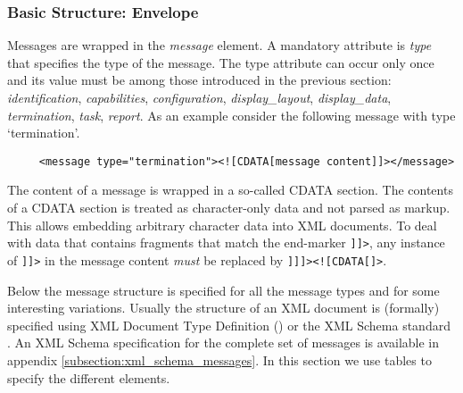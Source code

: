 \documentclass{article}
\begin{document}
   \subsubsection{Basic Structure: Envelope} \label{ss:structure}

    \noindent Messages are wrapped in the \textit{message} element. A mandatory
    attribute is \textit{type} that specifies the type of the message. The type
    attribute can occur only once and its value must be among those introduced
    in the previous section: \textit{identification}, \textit{capabilities},
    \textit{configuration}, \textit{display\_layout}, \textit{display\_data},
    \textit{termination}, \textit{task},
    \textit{report}. As an example consider the following message with type
    `termination'.
 
    \begin{verbatim}
     <message type="termination"><![CDATA[message content]]></message>\end{verbatim}

    \noindent The content of a message is wrapped in a so-called CDATA section. The
    contents of a CDATA section is treated as character-only data and not
    parsed as markup. This allows embedding arbitrary character data into XML
    documents. To deal with data that contains fragments that match the
    end-marker \verb']]>', any instance of \verb']]>' in the message content
    \textit{must} be replaced by \verb']]]><![CDATA[]>'.
    
    \noindent Below the message structure is specified for all the
    message types and for some interesting variations. Usually the structure
    of an XML document is (formally) specified using XML Document Type
    Definition (\cite{Sperberg-McQueen:06:EML}) or the XML Schema standard
    \cite{Malhotra:06:XSP}. An XML Schema specification for the complete set of
    messages is available in appendix \ref{subsection:xml_schema_messages}. In
    this section we use tables to specify the different elements.


   
\end{document}
